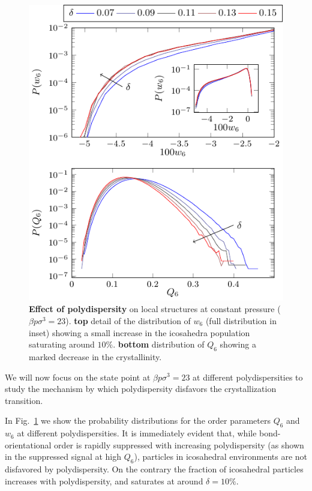 \documentclass[twocolumn,superscriptaddress]{revtex4-1}
\begin{document}
\begin{figure}
 \centering
 \includegraphics{fig_polydistrib}
 \caption{\textbf{Effect of polydispersity} on local structures at constant pressure ($\beta p\sigma^3=23$). \textbf{top} detail of the distribution of $w_6$ (full distribution in inset) showing a small increase in the icosahedra population saturating around $10\%$. \textbf{bottom} distribution of $Q_6$ showing a marked decrease in the crystallinity.}
 \label{fig:polydispersity}
\end{figure}

We will now focus on the state point at $\beta p\sigma^3=23$ at different polydispersities to
study the mechanism by which polydispersity disfavors the crystallization transition.

In Fig.~\ref{fig:polydispersity} we show the probability distributions for the order
parameters $Q_6$ and $w_6$ at different polydispersities. It is immediately
evident that, while bond-orientational order is rapidly suppressed with increasing
polydispersity (as shown in the suppressed signal at high $Q_6$), particles in icosahedral
environments are not disfavored by polydispersity. On the contrary the fraction of
icosahedral particles increases with polydispersity, and saturates at around $\delta=10\%$.
\end{document}
